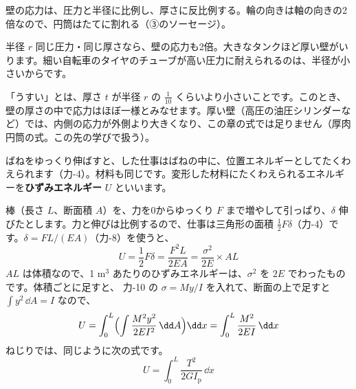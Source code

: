 \begin{phyomi}[$\sigma_\theta=\dfrac{pr}{t}$]
壁の応力は、圧力と半径に比例し、厚さに反比例する。輪の向きは軸の向きの2倍なので、円筒はたてに割れる（③のソーセージ）。
\end{phyomi}
\begin{phbaisuru}{半径 $r$}
同じ圧力・同じ厚さなら、壁の応力も2倍。大きなタンクほど厚い壁がいります。細い自転車のタイヤのチューブが高い圧力に耐えられるのは、半径が小さいからです。
\end{phbaisuru}

\begin{seikaku}
「うすい」とは、厚さ $t$ が半径 $r$ の $\tfrac{1}{10}$ くらいより小さいことです。このとき、壁の厚さの中で応力はほぼ一様とみなせます。厚い壁（高圧の油圧シリンダーなど）では、内側の応力が外側より大きくなり、この章の式では足りません（厚肉円筒の式。この先の学びで扱う）。
\end{seikaku}

\begin{phflow}
\end{phflow}

\label{ph:力-11:sec8}ばねをゆっくり伸ばすと、した仕事はばねの中に、位置エネルギーとしてたくわえられます（力-4）。材料も同じです。変形した材料にたくわえられるエネルギーを\textbf{ひずみエネルギー} $U$ といいます。

棒（長さ $L$、断面積 $A$）を、力を0からゆっくり $F$ まで増やして引っぱり、$\delta$ 伸びたとします。力と伸びは比例するので、仕事は三角形の面積 $\tfrac{1}{2}F\delta$（力-4）です。$\delta=FL/(EA)$（力-8）を使うと、
\[ U=\frac{1}{2}F\delta=\frac{F^2L}{2EA}=\frac{\sigma^2}{2E}\times AL \]
$AL$ は体積なので、1 m$^3$ あたりのひずみエネルギーは、$\sigma^2$ を $2E$ でわったものです。体積ごとに足すと、
力-10 の $\sigma=My/I$ を入れて、断面の上で足すと $\displaystyle\int y^2\,\dd A=I$ なので、
\[ U=\int_0^L\Bigl(\int\frac{M^2y^2}{2EI^2}\,\dd A\Bigr)\dd x=\int_0^L\frac{M^2}{2EI}\,\dd x \]
ねじりでは、同じように次の式です。
\[U=\int_0^L\frac{T^2}{2GI_{\mathrm p}}\,\dd x\]

